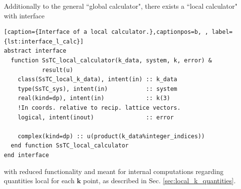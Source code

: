 \documentclass[10pt,a4paper]{article}
\begin{document}
Additionally to the general ``global calculator", there exists a ``local calculator" with interface
\begin{codebox}{}
\begin{lstlisting}[caption={Interface of a local calculator.},captionpos=b, , label={lst:interface_l_calc}]
abstract interface
  function SsTC_local_calculator(k_data, system, k, error) &
           result(u)
    class(SsTC_local_k_data), intent(in) :: k_data
    type(SsTC_sys), intent(in)           :: system
    real(kind=dp), intent(in)            :: k(3)
    !In coords. relative to recip. lattice vectors.
    logical, intent(inout)               :: error

    complex(kind=dp) :: u(product(k_data%integer_indices))
  end function SsTC_local_calculator
end interface
\end{lstlisting}
\end{codebox}
with reduced functionality and meant for internal computations regarding quantities local for each $\bm{k}$ point, as described in Sec. \ref{sec:local_k_quantities}.
\end{document}
